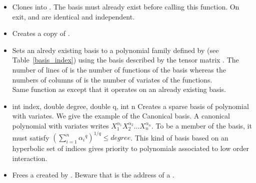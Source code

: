 \begin{itemize}
\item {}
  \sshortdescribe Clones  into . The basis  must
  already exist before calling this function. On exit,  and 
  are identical and independent.
\item {}
  \sshortdescribe Creates a copy of .
\item {}
  \sshortdescribe Sets an alredy existing basis  to a polynomial family
  defined by  (see Table~\ref{basis_index}) using the basis
  described by the tensor matrix . The number of lines of  is
  the number of functions of the basis whereas the numbers of columns of
   is the number of variates of the functions. \\
  Same function as  except that it
  operates on an already existing basis.

\item  {}
  {int index, double degree, double q, int n}
  \sshortdescribe Creates a sparse basis of polynomial with 
  variates. We give the example of the Canonical basis. A canonical polynomial
  with  variates writes $X_1^{\alpha_1} X_2^{\alpha_2} \dots
  X_n^{\alpha_n}$. To be a member of the basis, it must satisfy $\left(\sum_{i=1}^n
    {\alpha_i}^q \right)^{1/q} \leq degree$. This kind of basis based on an
  hyperbolic set of indices gives priority to polynomials associated to low
  order interaction.

\item  {}
  \sshortdescribe Frees a  created by
  . Beware that  is the address of a
  \ptr.

\end{itemize}


